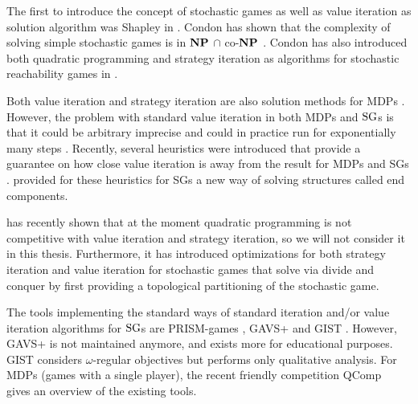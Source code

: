 The first to introduce the concept of stochastic games as well as value iteration as solution algorithm was Shapley in \cite{shapley}.
Condon has shown that the complexity of solving simple stochastic games is in $\mathbf{NP}$ $\cap$ co-$\mathbf{NP}$ \cite{condonComplexity}.
Condon has also introduced both quadratic programming and strategy iteration as algorithms for stochastic reachability games in \cite{condonQP}. 

Both value iteration and strategy iteration are also solution methods for MDPs \cite{Puterman}\cite{HoffmanKarp}.
However, the problem with standard value iteration in both MDPs and $\textrm{SG}$s is that it could be arbitrary imprecise \cite{haddadmonmege} and 
could in practice run for exponentially many steps \cite{viExponential}.
Recently, several heuristics were introduced that provide a guarantee on how close value iteration is away from the result for MDPs \cite{haddadmonmege} and SGs \cite{paperMaxi}.
\cite{widestPath} provided for these heuristics for SGs a new way of solving structures called end components.

\cite{gandalf} has recently shown that at the moment quadratic programming is not competitive with value iteration and strategy iteration,
so we will not consider it in this thesis. 
Furthermore, it has introduced optimizations for both strategy iteration and value iteration for stochastic games that solve via divide and conquer by 
first providing a topological partitioning of the stochastic game.


The tools implementing the standard ways of standard iteration and/or value iteration algorithms for $\textrm{SG}$s are PRISM-games \cite{PRISM-games}, 
GAVS+ \cite{gavs+} and GIST \cite{chatterjee2010gist}.
However, GAVS+ is not maintained anymore, and exists more for educational purposes.
GIST considers $\omega$-regular objectives but performs only qualitative analysis. 
For MDPs (games with a single player), the recent friendly competition QComp~\cite{qcomp} gives an overview of the existing tools.